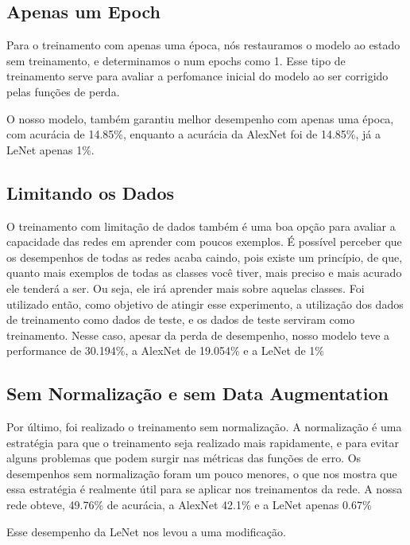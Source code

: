 \documentclass[conference]{IEEEtran}
\begin{document}
\subsection{Apenas um Epoch}
Para o treinamento com apenas uma época, nós restauramos o modelo ao estado sem treinamento, e determinamos o num epochs como 1. Esse tipo de treinamento serve para avaliar a perfomance inicial do modelo ao ser corrigido pelas funções de perda.

O nosso modelo, também garantiu melhor desempenho com apenas uma época, com acurácia de 14.85\%, enquanto a acurácia da AlexNet foi de 14.85\%, já a LeNet apenas 1\%.

\subsection{Limitando os Dados}
O treinamento com limitação de dados também é uma boa opção para avaliar a capacidade das redes em aprender com poucos exemplos.
É possível perceber que os desempenhos de todas as redes acaba caindo, pois existe um princípio, de que, quanto mais exemplos de todas as classes você tiver, mais preciso e mais acurado ele tenderá a ser. Ou seja, ele irá aprender mais sobre aquelas classes.
Foi utilizado então, como objetivo de atingir esse experimento, a utilização dos dados de treinamento como dados de teste, e os dados de teste serviram como treinamento.
Nesse caso, apesar da perda de desempenho, nosso modelo teve a performance de 30.194\%, a AlexNet de 19.054\% e a LeNet de 1\%

\subsection{Sem Normalização e sem Data Augmentation}
Por último, foi realizado o treinamento sem normalização. A normalização é uma estratégia para que o treinamento seja realizado mais rapidamente, e para evitar alguns problemas que podem surgir nas métricas das funções de erro.
Os desempenhos sem normalização foram um pouco menores, o que nos mostra que essa estratégia é realmente útil para se aplicar nos treinamentos da rede.
A nossa rede obteve, 49.76\% de acurácia, a AlexNet 42.1\% e a LeNet apenas 0.67\%

Esse desempenho da LeNet nos levou a uma modificação.





\end{document}
